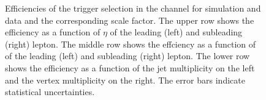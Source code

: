 \begin{figure}[htbp!]
\begin{center}
      \caption{Efficiencies of the trigger selection in the \mumu channel for simulation and data and the corresponding scale factor. The upper row shows the efficiency as a function of $\eta$ of the leading (left) and subleading (right) lepton. The middle row shows the effciency as a function of \pt of the leading (left) and subleading (right) lepton. The lower row shows the efficiency as a function of the jet multiplicity on the left and the vertex multiplicity on the right.
      The error bars indicate statistical uncertainties. }  
      
    \label{fig:MET_mumu}
  \end{center}
\end{figure}

